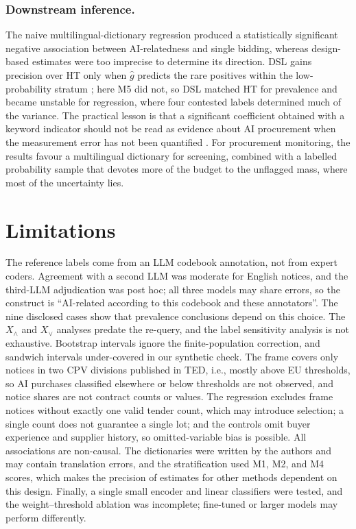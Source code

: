 \documentclass[runningheads]{llncs}
\begin{document}
\subsubsection{Downstream inference.} The naive multilingual-dictionary regression produced a statistically significant negative association between AI-relatedness and single bidding, whereas design-based estimates were too imprecise to determine its direction. DSL gains precision over HT only when $\hat{g}$ predicts the rare positives within the low-probability stratum \cite{egami2023,audinet2025}; here M5 did not, so DSL matched HT for prevalence and became unstable for regression, where four contested labels determined much of the variance. The practical lesson is that a significant coefficient obtained with a keyword indicator should not be read as evidence about AI procurement when the measurement error has not been quantified \cite{battaglia2025}. For procurement monitoring, the results favour a multilingual dictionary for screening, combined with a labelled probability sample that devotes more of the budget to the unflagged mass, where most of the uncertainty lies.

\section{Limitations}
The reference labels come from an LLM codebook annotation, not from expert coders. Agreement with a second LLM was moderate for English notices, and the third-LLM adjudication was post hoc; all three models may share errors, so the construct is ``AI-related according to this codebook and these annotators''. The nine disclosed cases show that prevalence conclusions depend on this choice. The $X_\wedge$ and $X_\vee$ analyses predate the re-query, and the label sensitivity analysis is not exhaustive. Bootstrap intervals ignore the finite-population correction, and sandwich intervals under-covered in our synthetic check. The frame covers only notices in two CPV divisions published in TED, i.e., mostly above EU thresholds, so AI purchases classified elsewhere or below thresholds are not observed, and notice shares are not contract counts or values. The regression excludes frame notices without exactly one valid tender count, which may introduce selection; a single count does not guarantee a single lot; and the controls omit buyer experience and supplier history, so omitted-variable bias is possible. All associations are non-causal. The dictionaries were written by the authors and may contain translation errors, and the stratification used M1, M2, and M4 scores, which makes the precision of estimates for other methods dependent on this design. Finally, a single small encoder and linear classifiers were tested, and the weight--threshold ablation was incomplete; fine-tuned or larger models may perform differently.
\end{document}
